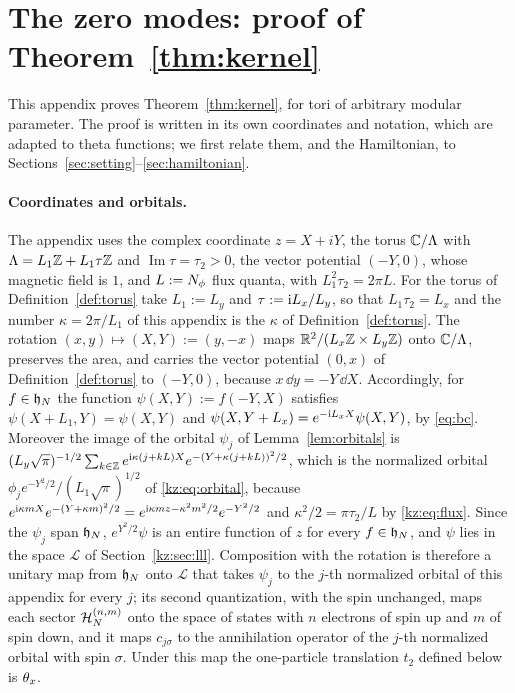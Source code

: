 \section{The zero modes: proof of Theorem~\ref{thm:kernel}}\label{app:kernel}
\begingroup
\newcommand{\kzG}{\mathcal{G}}
\newcommand{\kzH}{\mathcal{H}}
\newcommand{\kzL}{\mathcal{L}}
\newcommand{\kzP}{\mathcal{P}}
\newcommand{\kzD}{\mathsf{D}}
\newcommand{\kzq}{\mathsf{q}}
\newcommand{\kzTh}{\Theta}
\newcommand{\kzvth}{\vartheta}

This appendix proves Theorem~\ref{thm:kernel}, for tori of arbitrary modular parameter. The proof is written in its
own coordinates and notation, which are adapted to theta functions; we first relate them, and the Hamiltonian, to
Sections~\ref{sec:setting}--\ref{sec:hamiltonian}.

\paragraph{Coordinates and orbitals.} The appendix uses the complex coordinate $z=X+iY$, the torus $\mathbb{C}/\Lambda$ with
$\Lambda=L_1\mathbb{Z}+L_1\tau\mathbb{Z}$ and $\operatorname{Im}\tau=\tau_2>0$, the vector potential $(-Y,0)$, whose magnetic field is $1$, and
$L:=N_{\phi}$ flux quanta, with $L_1^2\tau_2=2\pi L$. For the torus of Definition~\ref{def:torus} take $L_1:=L_y$ and
$\tau:=\mathrm{i} L_x/L_y$, so that $L_1\tau_2=L_x$ and the number $\kappa=2\pi/L_1$ of this appendix is the $\kappa$ of
Definition~\ref{def:torus}. The rotation $(x,y)\mapsto(X,Y):=(y,-x)$ maps $\mathbb{R}^2/(L_x\mathbb{Z}\times L_y\mathbb{Z})$ onto $\mathbb{C}/\Lambda$,
preserves the area, and carries the vector potential $(0,x)$ of Definition~\ref{def:torus} to $(-Y,0)$, because
$x\,\dd y=-Y\,\dd X$. Accordingly, for $f\in\mathfrak{h}_N$ the function $\psi(X,Y):=f(-Y,X)$ satisfies $\psi(X+L_1,Y)=\psi(X,Y)$ and
$\psi(X,Y+L_x)=e^{-\mathrm{i} L_xX}\psi(X,Y)$, by \eqref{eq:bc}. Moreover the image of the orbital $\psi_j$ of
Lemma~\ref{lem:orbitals} is $(L_y\sqrt\pi)^{-1/2}\sum_{k\in\mathbb{Z}}e^{\mathrm{i}\kappa(j+kL)X}e^{-(Y+\kappa(j+kL))^2/2}$, which is the
normalized orbital $\phi_je^{-Y^2/2}/(L_1\sqrt\pi)^{1/2}$ of \eqref{kz:eq:orbital}, because
$e^{\mathrm{i}\kappa mX}e^{-(Y+\kappa m)^2/2}=e^{\mathrm{i}\kappa mz-\kappa^2m^2/2}e^{-Y^2/2}$ and $\kappa^2/2=\pi\tau_2/L$ by \eqref{kz:eq:flux}. Since the
$\psi_j$ span $\mathfrak{h}_N$, $e^{Y^2/2}\psi$ is an entire function of $z$ for every $f\in\mathfrak{h}_N$, and $\psi$ lies in the space $\kzL$
of Section~\ref{kz:sec:lll}. Composition with the rotation is therefore a unitary map from $\mathfrak{h}_N$ onto $\kzL$ that
takes $\psi_j$ to the $j$-th normalized orbital of this appendix for every $j$; its second quantization, with the spin
unchanged, maps each sector $\mathcal{H}_N^{(n,m)}$ onto the space of states with $n$ electrons of spin up and $m$ of spin down,
and it maps $c_{j\sigma}$ to the annihilation operator of the $j$-th normalized orbital with spin $\sigma$. Under this map
the one-particle translation $t_2$ defined below is $\theta_x$.

